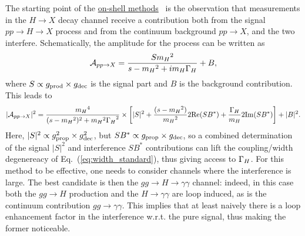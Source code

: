 The starting point of the \underline{on-shell
methods}~\cite{Dixon:2003yb,Martin:2012xc,Dixon:2013haa,Campbell:2017rke}
is the observation that measurements in the $H\to X$ decay channel
receive a contribution both from the signal $p p \to H \to X$ process
and from the continuum background $p p \to X$, and the two
interfere. Schematically, the amplitude for the process can be written
as
\begin{equation}
\mathcal A_{p p \to X} = \frac{S {m_H}^2}{s-{m_H}^2 + i {m_H}{\Gamma_H}} + B,
\end{equation}
where $S\propto g_{\rm prod}\times g_{\rm dec}$ is the signal part and $B$ is the background 
contribution. This leads to
\begin{equation}
|\mathcal A_{p p \to X}|^2 = \frac{{m_H}^4}{(s-{m_H}^2)^2 + {m_H}^2{\Gamma_H}^2}
\times\left[
|S|^2 + \frac{(s-{m_H}^2)}{{m_H}^2} 2{\rm Re}(S B^*) + \frac{{\Gamma_H}}{{m_H}} 2{\rm Im}(S B^*)
\right] + |B|^2.
\label{eq:width_gammagamma}
\end{equation}
Here, $|S|^2\propto g_{\rm prop}^2 \times g_{\rm dec}^2$, but 
$SB^*\propto g_{\rm prop}\times g_{\rm dec}$, so a combined determination of the signal $|S|^2$ and
interference $SB^*$ contributions can lift the coupling/width degenereacy of 
Eq.~(\ref{eq:width_standard}), thus giving access to ${\Gamma_H}$. 
For this method to be effective, one needs to consider channels where
the interference is large. The best candidate is then the $gg\to H\to \gamma\gamma$ channel: indeed,
in this case both the $gg\to H$ production and the $H\to\gamma\gamma$ are loop induced, as is
the continuum contribution $gg\to\gamma\gamma$. This implies that at least naively there is a loop
enhancement factor in the interference w.r.t. the pure signal, thus making the former noticeable. 

